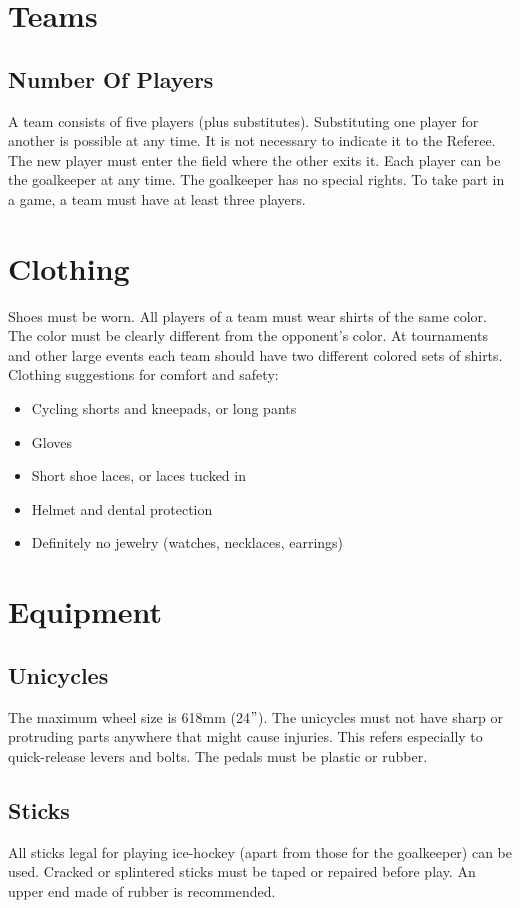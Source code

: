 \section{Teams}

\subsection{Number Of Players}
A team consists of five players (plus substitutes).
Substituting one player for another is possible at any time.
It is not necessary to indicate it to the Referee.
The new player must enter the field where the other exits it.
Each player can be the goalkeeper at any time.
The goalkeeper has no special rights.
To take part in a game, a team must have at least three players.

\section{Clothing}
Shoes must be worn.
All players of a team must wear shirts of the same color.
The color must be clearly different from the opponent's color.
At tournaments and other large events each team should have two different colored sets of shirts.\\
Clothing suggestions for comfort and safety:
\begin{itemize}
\item Cycling shorts and kneepads, or long pants
\item Gloves
\item Short shoe laces, or laces tucked in
\item Helmet and dental protection
\item Definitely no jewelry (watches, necklaces, earrings)
\end{itemize}

\section{Equipment}

\subsection{Unicycles}
The maximum wheel size is 618mm (24$"$).
The unicycles must not have sharp or protruding parts anywhere that might cause injuries.
This refers especially to quick-release levers and bolts.
The pedals must be plastic or rubber.

\subsection{Sticks}
All sticks legal for playing ice-hockey (apart from those for the goalkeeper) can be used.
Cracked or splintered sticks must be taped or repaired before play.
An upper end made of rubber is recommended.

